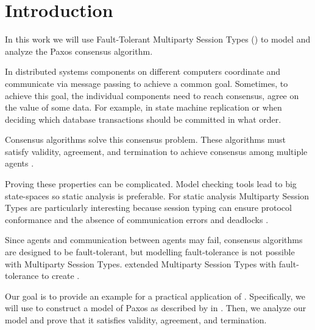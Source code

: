 \chapter{Introduction}
In this work we will use Fault-Tolerant Multiparty Session Types (\FTMPST) to model and analyze the Paxos consensus algorithm.

In distributed systems components on different computers coordinate and communicate via message passing to achieve a common goal.
Sometimes, to achieve this goal, the individual components need to reach consensus, \ie agree on the value of some data.
For example, in state machine replication or when deciding which database transactions should be committed in what order.

Consensus algorithms solve this consensus problem.
These algorithms must satisfy validity, agreement, and termination to achieve consensus among multiple agents \cite{CoulourisEtal01}.

Proving these properties can be complicated.
Model checking tools lead to big state-spaces so static analysis is preferable.
For static analysis Multiparty Session Types are particularly interesting because session typing can ensure protocol conformance and the absence of communication errors and deadlocks \cite{ScalasEtal18}.

Since agents and communication between agents may fail, consensus algorithms are designed to be fault-tolerant, but modelling fault-tolerance is not possible with Multiparty Session Types.
\citeauthor{PetersEtal21} extended Multiparty Session Types with fault-tolerance to create \FTMPST.

Our goal is to provide an example for a practical application of \FTMPST.
Specifically, we will use \FTMPST to construct a model of Paxos as described by \citeauthor{Lamport01} in \cite{Lamport01}.
Then, we analyze our model and prove that it satisfies validity, agreement, and termination.

